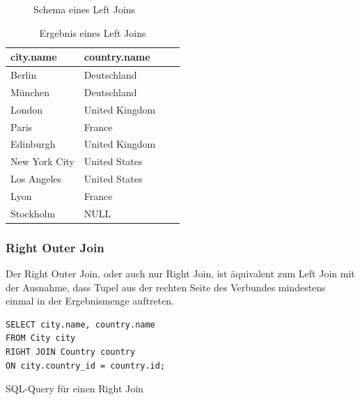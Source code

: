 \documentclass[a4paper]{article}
\begin{document}
\begin{minipage}{\textwidth}
\begin{minipage}[b]{0.49\textwidth}
\begin{figure}[H]
\caption{Schema eines Left Joins}
\end{figure}
\end{minipage}
\hfill
\begin{minipage}[b]{0.49\textwidth}
\begin{table}[H]
\centering
  \begin{tabular}{| l | l | l | l |}
    \hline
    city.name & country.name\\ \hline
    \hline
   Berlin & Deutschland \\ \hline
   München & Deutschland \\ \hline
   London & United Kingdom \\ \hline
   Paris & France \\ \hline
   Edinburgh & United Kingdom \\ \hline
   New York City & United States \\ \hline
   Los Angeles & United States \\ \hline
   Lyon & France \\ \hline
   Stockholm & NULL \\ \hline
  \end{tabular}
\caption{Ergebnis eines Left Joins}
\label{tab:left-join}
\end{table}
\end{minipage}
\end{minipage}

\newpage
\subsubsection{Right Outer Join}
\label{sec:right-join}
Der Right Outer Join, oder auch nur Right Join, ist äquivalent zum Left Join mit der Ausnahme, dass Tupel aus der rechten Seite des Verbundes mindestens einmal in der Ergebnismenge auftreten.

\begin{listing}[H]
\begin{verbatim}
SELECT city.name, country.name 
FROM City city
RIGHT JOIN Country country 
ON city.country_id = country.id;
\end{verbatim}
\caption{SQL-Query für einen Right Join}
\label{lst:right-join}
\end{listing}
\end{document}
